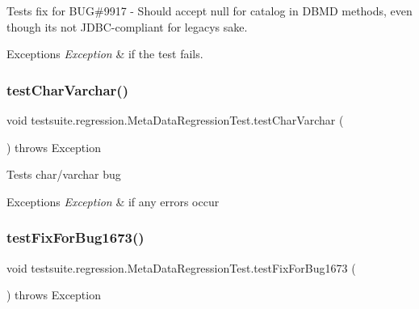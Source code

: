 Tests fix for B\+UG\#9917 -\/ Should accept null for catalog in D\+B\+MD methods, even though it\textquotesingle{}s not J\+D\+B\+C-\/compliant for legacy\textquotesingle{}s sake.


\begin{DoxyExceptions}{Exceptions}
{\em Exception} & if the test fails. \\
\hline
\end{DoxyExceptions}
\mbox{\label{classtestsuite_1_1regression_1_1_meta_data_regression_test_a34109c03092379ea3c085035c26f8343}} 
\subsubsection{\texorpdfstring{test\+Char\+Varchar()}{testCharVarchar()}}
{\footnotesize\ttfamily void testsuite.\+regression.\+Meta\+Data\+Regression\+Test.\+test\+Char\+Varchar (\begin{DoxyParamCaption}{ }\end{DoxyParamCaption}) throws Exception}

Tests char/varchar bug


\begin{DoxyExceptions}{Exceptions}
{\em Exception} & if any errors occur \\
\hline
\end{DoxyExceptions}
\mbox{\label{classtestsuite_1_1regression_1_1_meta_data_regression_test_ab44999b95186ac7d583472c97d1fe24c}} 
\subsubsection{\texorpdfstring{test\+Fix\+For\+Bug1673()}{testFixForBug1673()}}
{\footnotesize\ttfamily void testsuite.\+regression.\+Meta\+Data\+Regression\+Test.\+test\+Fix\+For\+Bug1673 (\begin{DoxyParamCaption}{ }\end{DoxyParamCaption}) throws Exception}

